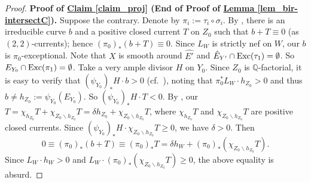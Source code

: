 \begin{proof}
\par \vskip 1pc \noindent
\textbf{Proof of {\hyperref[claim_proj]{Claim \ref*{claim_proj}}}  (End of Proof of {\hyperref[lem_bir-intersectC]{Lemma \ref*{lem_bir-intersectC}}}).}
Suppose the contrary. 
Denote by $\pi_i:=\tau_i\circ\sigma_i$.
By  \cite[Theorem 2.5]{Pet86}, there is an irreducible curve $b$ and a positive closed current $T$ on $Z_0$ such that $b+T\equiv0$ (as $(2,2)$-currents); hence $(\pi_0)_*(b+T)\equiv0$.
Since $L_W$ is strictly nef on $W$, our $b$ is $\pi_0$-exceptional.
Note that $X$ is smooth around $\hat{E'}$ and $\hat{E}_{Y'}\cap \textup{Exc}(\tau_1)=\emptyset$.
So $E_{Y_0}\cap\textup{Exc}(\pi_1)=\emptyset$.
Take a very ample divisor $H$ on $Y_0$.
Since $Z_0$ is $\mathbb{Q}$-factorial, it is easy to verify that $(\psi_{Y_0})_*H\cdot b>0$ (cf.~\cite[Lemma 2.62]{KM98}), noting that $\pi_0^*L_W\cdot h_{Z_0}>0$   and thus $b\neq h_{Z_0}:=\psi_{Y_0}(E_{Y_0})$.
So  $(\psi_{Y_0})_*H\cdot T<0$.
By \cite{Siu74}, our $T=\chi_{h_{Z_0}}T+\chi_{Z_0\backslash h_{Z_0}}T=\delta h_{Z_0}+\chi_{Z_0\backslash h_{Z_0}}T$, where $\chi_{h_{Z_0}}T$ and $\chi_{Z_0\backslash h_{Z_0}}T$ are positive closed currents. 
Since $(\psi_{Y_0})_*H\cdot \chi_{Z_0\backslash h_{Z_0}}T\geqslant 0$, we have $\delta>0$.
Then
$$0\equiv (\pi_0)_*(b+T)\equiv (\pi_0)_*T=\delta h_W+(\pi_0)_*(\chi_{Z_0\backslash h_{Z_0}}T).$$
 Since $L_W\cdot h_W>0$ and $L_W\cdot(\pi_0)_*(\chi_{Z_0\backslash h_{Z_0}}T)\geqslant 0$, the above equality is absurd.
\end{proof}


